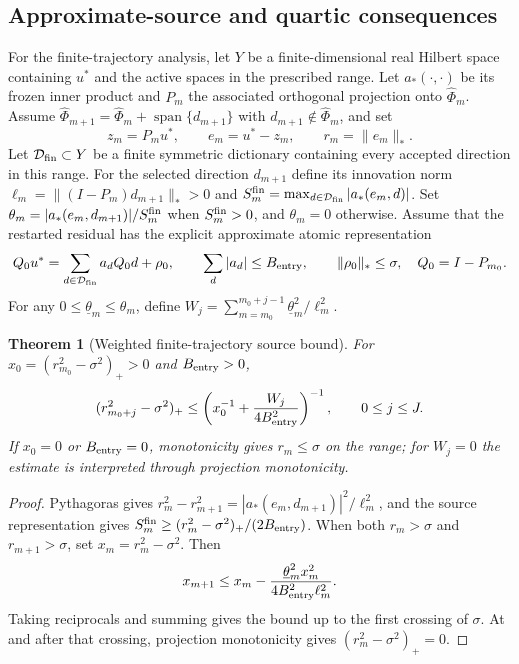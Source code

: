 \documentclass[11pt]{article}
\newtheorem{theorem}{Theorem}[section]
\theoremstyle{remark}\newtheorem{remark}[theorem]{Remark}
\begin{document}
\subsection{Approximate-source and quartic consequences}
\label{sec:c5-source}

For the finite-trajectory analysis, let \(Y\) be a finite-dimensional real Hilbert space containing \(u^*\) and the active spaces in the prescribed range. Let \(a_*(\cdot,\cdot)\) be its frozen inner product and \(P_m\) the associated orthogonal projection onto \(\widehat\Phi_m\). Assume
$\widehat\Phi_{m+1}=\widehat\Phi_m+\operatorname{span}\{d_{m+1}\}$ with
$d_{m+1}\notin\widehat\Phi_m$, and set
\[
 z_m=P_mu^*,\qquad e_m=u^*-z_m,\qquad r_m=\|e_m\|_*.
\]
Let $\mathcal D_{\rm fin}\subset Y$ be a finite symmetric dictionary containing every accepted direction in this range.
For the selected direction $d_{m+1}$ define its innovation norm
$\ell_m=\|(I-P_m)d_{m+1}\|_*>0$ and
$S_m^{\rm fin}=\max_{d\in\mathcal D_{\rm fin}}|a_*(e_m,d)|$.
Set $\theta_m=|a_*(e_m,d_{m+1})|/S_m^{\rm fin}$ when
$S_m^{\rm fin}>0$, and $\theta_m=0$ otherwise.  Assume that the restarted
residual has the explicit approximate atomic representation
\[
 Q_0u^*=\sum_{d\in\mathcal D_{\rm fin}}a_dQ_0d+\rho_0,
 \qquad \sum_d|a_d|\leq B_{\rm entry},\qquad \|\rho_0\|_*\leq\sigma,
 \quad Q_0=I-P_{m_0}.
\]
For any $0\leq\underline\theta_m\leq\theta_m$, define
$W_j=\sum_{m=m_0}^{m_0+j-1}\underline\theta_m^2/\ell_m^2$.

\begin{theorem}[Weighted finite-trajectory source bound]
\label{thm:c5-source}
For $x_0=(r_{m_0}^2-\sigma^2)_+>0$ and $B_{\rm entry}>0$,
\begin{equation}
 (r_{m_0+j}^2-\sigma^2)_+
 \leq\left(x_0^{-1}+\frac{W_j}{4B_{\rm entry}^2}\right)^{-1},
 \qquad 0\le j\le J.
 \label{eq:c5-source-initial}
\end{equation}
If $x_0=0$ or $B_{\rm entry}=0$, monotonicity gives $r_m\leq\sigma$ on the range;
for $W_j=0$ the estimate is interpreted through projection monotonicity.
\end{theorem}
\begin{proof}
Pythagoras gives \(r_m^2-r_{m+1}^2=|a_*(e_m,d_{m+1})|^2/\ell_m^2\), and the source representation gives \(S_m^{\rm fin}\ge(r_m^2-\sigma^2)_+/(2B_{\rm entry})\). When both \(r_m>\sigma\) and \(r_{m+1}>\sigma\), set \(x_m=r_m^2-\sigma^2\). Then
\[
 x_{m+1}\le x_m-\frac{\underline\theta_m^2x_m^2}{4B_{\rm entry}^2\ell_m^2}.
\]
Taking reciprocals and summing gives the bound up to the first crossing of \(\sigma\). At and after that crossing, projection monotonicity gives \((r_m^2-\sigma^2)_+=0\).
\end{proof}
\end{document}
